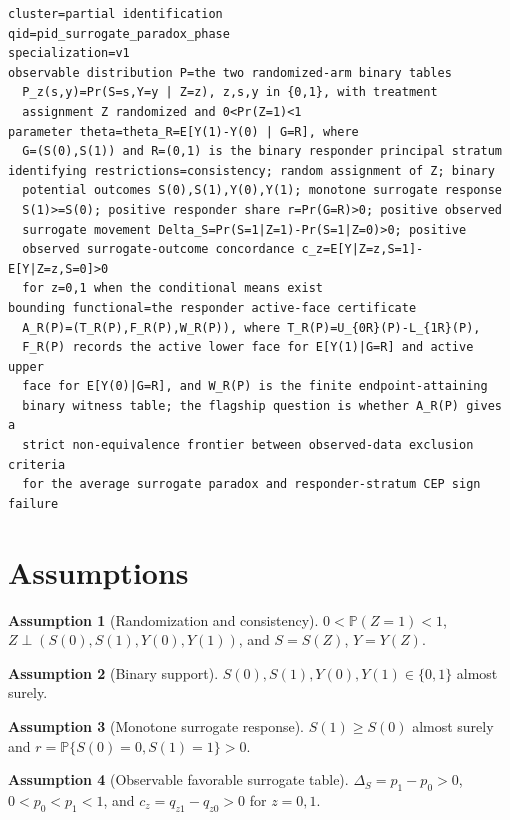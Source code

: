 \documentclass[11pt]{article}
\renewcommand{\Pr}{\mathbb{P}}
\theoremstyle{definition}
\newtheorem{assumption}{Assumption}
\theoremstyle{plain}
\theoremstyle{remark}
\begin{document}
\begin{verbatim}
cluster=partial identification
qid=pid_surrogate_paradox_phase
specialization=v1
observable distribution P=the two randomized-arm binary tables
  P_z(s,y)=Pr(S=s,Y=y | Z=z), z,s,y in {0,1}, with treatment
  assignment Z randomized and 0<Pr(Z=1)<1
parameter theta=theta_R=E[Y(1)-Y(0) | G=R], where
  G=(S(0),S(1)) and R=(0,1) is the binary responder principal stratum
identifying restrictions=consistency; random assignment of Z; binary
  potential outcomes S(0),S(1),Y(0),Y(1); monotone surrogate response
  S(1)>=S(0); positive responder share r=Pr(G=R)>0; positive observed
  surrogate movement Delta_S=Pr(S=1|Z=1)-Pr(S=1|Z=0)>0; positive
  observed surrogate-outcome concordance c_z=E[Y|Z=z,S=1]-E[Y|Z=z,S=0]>0
  for z=0,1 when the conditional means exist
bounding functional=the responder active-face certificate
  A_R(P)=(T_R(P),F_R(P),W_R(P)), where T_R(P)=U_{0R}(P)-L_{1R}(P),
  F_R(P) records the active lower face for E[Y(1)|G=R] and active upper
  face for E[Y(0)|G=R], and W_R(P) is the finite endpoint-attaining
  binary witness table; the flagship question is whether A_R(P) gives a
  strict non-equivalence frontier between observed-data exclusion criteria
  for the average surrogate paradox and responder-stratum CEP sign failure
\end{verbatim}

\section{Assumptions}
\begin{assumption}[Randomization and consistency]\label{ass:randomization}
\(0<\Pr(Z=1)<1\), \(Z\perp (S(0),S(1),Y(0),Y(1))\), and \(S=S(Z)\), \(Y=Y(Z)\).
\end{assumption}

\begin{assumption}[Binary support]\label{ass:binary-support}
\(S(0),S(1),Y(0),Y(1)\in\{0,1\}\) almost surely.
\end{assumption}

\begin{assumption}[Monotone surrogate response]\label{ass:monotone-surrogate}
\(S(1)\ge S(0)\) almost surely and \(r=\Pr\{S(0)=0,S(1)=1\}>0\).
\end{assumption}

\begin{assumption}[Observable favorable surrogate table]\label{ass:favorable-observed}
\(\Delta_S=p_1-p_0>0\), \(0<p_0<p_1<1\), and \(c_z=q_{z1}-q_{z0}>0\) for \(z=0,1\).
\end{assumption}
\end{document}
